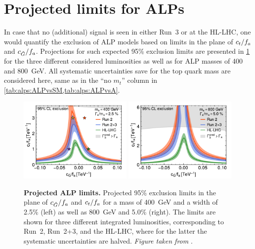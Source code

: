 \section{Projected limits for ALPs}
\label{sec:alps:limits}

In case that no (additional) signal is seen in either Run~3 or at the HL-LHC, one would quantify the exclusion of ALP models based on limits in the plane of $c_t/f_a$ and $c_{\tilde{G}}/f_a$. Projections for such expected 95\% exclusion limits are presented in \cref{fig:alps:limits} for the three different considered luminosities as well as for ALP masses of 400 and 800~GeV. All systematic uncertainties save for the top quark mass are considered here, same as in the ``no $m_t$'' column in \cref{tab:alps:ALPvsSM,tab:alps:ALPvsA}.

\begin{figure}[t]
    \centering
    \includegraphics[width=0.49\textwidth]{figures/alps/limits_m400_w2p5_notmass_small_width.pdf}
    \hfill
    \includegraphics[width=0.49\textwidth]{figures/alps/limits_m800_w5p0_notmass_small.pdf}
    \caption{
        \textbf{Projected ALP limits.} Projected 95\% exclusion limits in the plane of $c_{\tilde{G}}/f_a$ and $c_t/f_a$ for a mass of \SI{400}{\GeV} and a width of 2.5\% (left) as well as \SI{800}{\GeV} and 5.0\% (right). The limits are shown for three different integrated luminosities, corresponding to Run~2, Run~2+3, and the HL-LHC, where for the latter the systematic uncertainties are halved. \textit{Figure taken from }.
    }
    \label{fig:alps:limits}
\end{figure}

